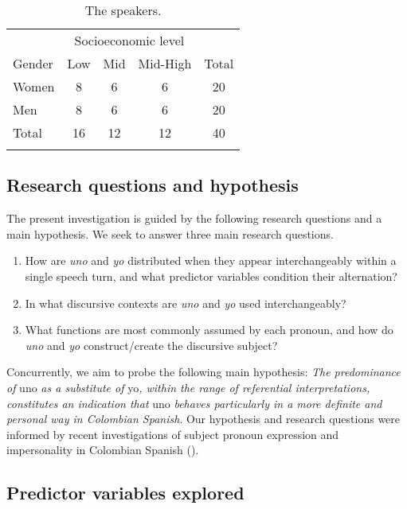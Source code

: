 \documentclass[output=paper]{langscibook}
\begin{document}
\begin{table}
\begin{tabular}{lcccc}
\lsptoprule
       & \multicolumn{3}{c}{Socioeconomic level} & \\\cmidrule(lr){2-4}
Gender & Low & Mid & Mid-High & Total\\
\midrule
 Women &  8 &  6 &  6 & 20\\
 Men &  8 &  6 &  6 &  20\\
\midrule
Total & 16 & 12 & 12 & 40\\
\lspbottomrule
\end{tabular}
\caption{The speakers.\label{tab:orozco:1}}
\end{table}


\subsection{Research questions and hypothesis}\label{sec:orozco:3.2}


The present investigation is guided by the following research questions and a main hypothesis. We seek to answer three main research questions. 


\begin{enumerate}
  \item How are \textit{uno} and \textit{yo} distributed when they appear interchangeably within a single speech turn, and what predictor variables condition their alternation? 
  \item In what discursive contexts are \textit{uno} and \textit{yo} used interchangeably? 
  \item What functions are most commonly assumed by each pronoun, and how do \textit{uno} and \textit{yo} construct/create the discursive subject?  
\end{enumerate}


Concurrently, we aim to probe the following main hypothesis: \textit{The predominance of} uno \textit{as a substitute of} yo\textit{, within the range of referential interpretations, constitutes an indication that} uno \textit{behaves particularly in a more definite and personal way in Colombian Spanish}. Our hypothesis and research questions were informed by recent investigations of subject pronoun expression and impersonality in Colombian Spanish (\citealt{Dieck2016, Hurtado2015, HurtadoGutiérrez-Rivas2016, HurtadoOrtega-Santos2019, Olave-AriasEtAl2021, Orozco2018, OrozcoHurtado2021}).




\subsection{Predictor variables explored}\label{sec:orozco:3.3}
\end{document}
